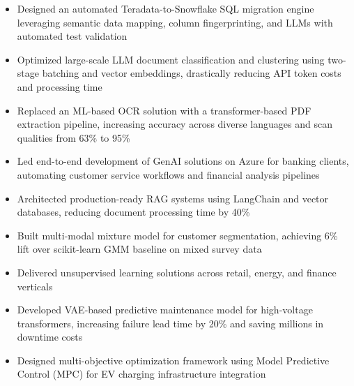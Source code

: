 
\begin{itemize}
    \item Designed an automated Teradata-to-Snowflake SQL migration engine leveraging semantic data mapping, column fingerprinting, and LLMs with automated test validation
    \item Optimized large-scale LLM document classification and clustering using two-stage batching and vector embeddings, drastically reducing API token costs and processing time
    \item Replaced an ML-based OCR solution with a transformer-based PDF extraction pipeline, increasing accuracy across diverse languages and scan qualities from 63\% to 95\%
\end{itemize}

\begin{itemize}
    \item Led end-to-end development of GenAI solutions on Azure for banking clients, automating customer service workflows and financial analysis pipelines
    \item Architected production-ready RAG systems using LangChain and vector databases, reducing document processing time by 40\%
    \item Built multi-modal mixture model for customer segmentation, achieving 6\% lift over scikit-learn GMM baseline on mixed survey data
    \item Delivered unsupervised learning solutions across retail, energy, and finance verticals
\end{itemize}

\begin{itemize}
    \item Developed VAE-based predictive maintenance model for high-voltage transformers, increasing failure lead time by 20\% and saving millions in downtime costs
    \item Designed multi-objective optimization framework using Model Predictive Control (MPC) for EV charging infrastructure integration
\end{itemize}

